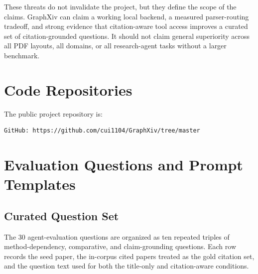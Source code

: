 \documentclass[10pt]{article}
\begin{document}
These threats do not invalidate the project, but they define the scope of the claims. GraphXiv can claim a working local backend, a measured parser-routing tradeoff, and strong evidence that citation-aware tool access improves a curated set of citation-grounded questions. It should not claim general superiority across all PDF layouts, all domains, or all research-agent tasks without a larger benchmark.

\section{Code Repositories}

The public project repository is:
\begin{lstlisting}[style=terminal]
GitHub: https://github.com/cui1104/GraphXiv/tree/master
\end{lstlisting}





\appendix
\footnotesize

\section{Evaluation Questions and Prompt Templates}

\subsection{Curated Question Set}

The 30 agent-evaluation questions are organized as ten repeated triples of method-dependency, comparative, and claim-grounding questions. Each row records the seed paper, the in-corpus cited papers treated as the gold citation set, and the question text used for both the title-only and citation-aware conditions.
\end{document}
